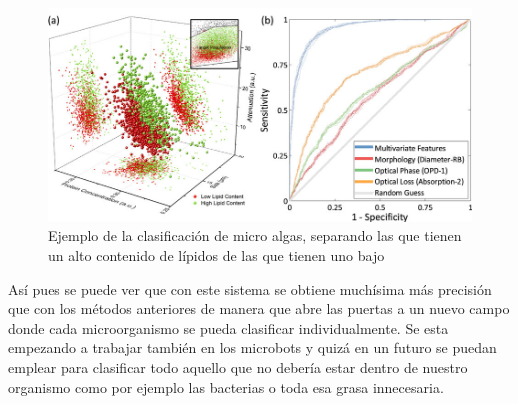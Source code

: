 \documentclass[a4paper, 12pt, UTF8]{article}
\begin{document}
\begin{figure}[h!]
	\centering
	\includegraphics[width=\linewidth]{impacto_2}
	\caption{Ejemplo de la clasificación de micro algas, separando las que tienen un alto contenido de lípidos de las que tienen uno bajo}
	\label{fig:impacto_2}
\end{figure}

Así pues se puede ver que con este sistema se obtiene muchísima más precisión que con los métodos anteriores de manera que abre las puertas a un nuevo campo donde cada microorganismo se pueda clasificar individualmente. Se esta empezando a trabajar también en los microbots \cite{microbots} y quizá en un futuro se puedan emplear para clasificar todo aquello que no debería estar dentro de nuestro organismo como por ejemplo las bacterias o toda esa grasa innecesaria. 



\end{document}
